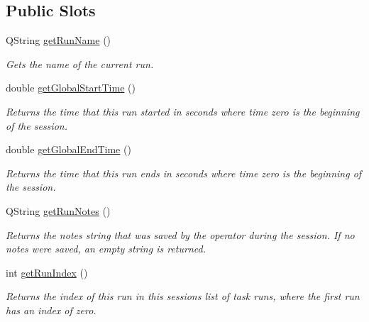 \subsection*{Public Slots}
\begin{DoxyCompactItemize}
\item 
Q\-String \hyperlink{class_picto_1_1_analysis_run_notes_data_a7575d60c058b190eee8294575514895e}{get\-Run\-Name} ()
\begin{DoxyCompactList}\small\item\em Gets the name of the current run. \end{DoxyCompactList}\item 
\hypertarget{class_picto_1_1_analysis_run_notes_data_a9bc1bb4dffba3483fd18134999679e18}{double \hyperlink{class_picto_1_1_analysis_run_notes_data_a9bc1bb4dffba3483fd18134999679e18}{get\-Global\-Start\-Time} ()}\label{class_picto_1_1_analysis_run_notes_data_a9bc1bb4dffba3483fd18134999679e18}

\begin{DoxyCompactList}\small\item\em Returns the time that this run started in seconds where time zero is the beginning of the session. \end{DoxyCompactList}\item 
\hypertarget{class_picto_1_1_analysis_run_notes_data_a40817c6aeb3dec54e6806104f98280b5}{double \hyperlink{class_picto_1_1_analysis_run_notes_data_a40817c6aeb3dec54e6806104f98280b5}{get\-Global\-End\-Time} ()}\label{class_picto_1_1_analysis_run_notes_data_a40817c6aeb3dec54e6806104f98280b5}

\begin{DoxyCompactList}\small\item\em Returns the time that this run ends in seconds where time zero is the beginning of the session. \end{DoxyCompactList}\item 
\hypertarget{class_picto_1_1_analysis_run_notes_data_af9d4e756146e7174a0f946154f1b2347}{Q\-String \hyperlink{class_picto_1_1_analysis_run_notes_data_af9d4e756146e7174a0f946154f1b2347}{get\-Run\-Notes} ()}\label{class_picto_1_1_analysis_run_notes_data_af9d4e756146e7174a0f946154f1b2347}

\begin{DoxyCompactList}\small\item\em Returns the notes string that was saved by the operator during the session. If no notes were saved, an empty string is returned. \end{DoxyCompactList}\item 
\hypertarget{class_picto_1_1_analysis_run_notes_data_a8777421ed280f561c88ccaa1dcfc028f}{int \hyperlink{class_picto_1_1_analysis_run_notes_data_a8777421ed280f561c88ccaa1dcfc028f}{get\-Run\-Index} ()}\label{class_picto_1_1_analysis_run_notes_data_a8777421ed280f561c88ccaa1dcfc028f}

\begin{DoxyCompactList}\small\item\em Returns the index of this run in this sessions list of task runs, where the first run has an index of zero. \end{DoxyCompactList}\end{DoxyCompactItemize}

